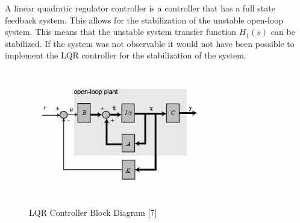 \documentclass[12pt]{article} %
\begin{document}
A linear quadratic regulator controller is a controller that has a full state feedback system. This allows for the stabilization of the unstable open-loop system. This means that the unstable system transfer function $H_1(s)$ can be stabilized. If the system was not observable it would not have been possible to implement the LQR controller for the stabilization of the system.
\\\\
\begin{figure}[h]
\caption{LQR Controller Block Diagram [7]}
\includegraphics[height=5cm, width=8cm]{lqr_block.jpg}
\label{fig:lqrblock}
\centering
\end{figure}
\end{document}
